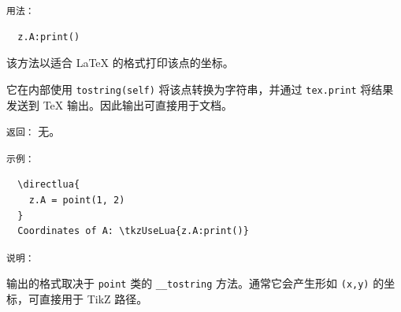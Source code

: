   \texttt{用法：}
  \begin{verbatim}
  z.A:print()
  \end{verbatim}

  \medskip

  该方法以适合 \LaTeX{} 的格式打印该点的坐标。

  它在内部使用 \texttt{tostring(self)} 将该点转换为字符串，并通过 \texttt{tex.print} 将结果发送到 \TeX{} 输出。因此输出可直接用于文档。

  \medskip

  \texttt{返回：} 无。

  \medskip

  \texttt{示例：}
  \begin{verbatim}
  \directlua{
    z.A = point(1, 2)
  }
  Coordinates of A: \tkzUseLua{z.A:print()}
  \end{verbatim}

  \medskip

  \texttt{说明：}

  输出的格式取决于 \texttt{point} 类的 \texttt{\_\_tostring} 方法。通常它会产生形如 \texttt{(x,y)} 的坐标，可直接用于 TikZ 路径。
\endinput
